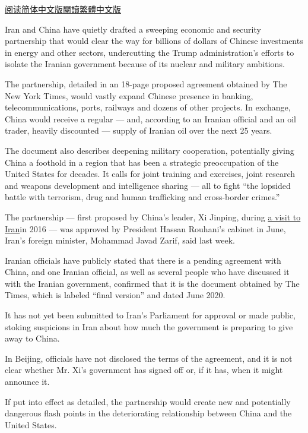 \href{https://cn.nytimes.com/world/20200713/china-iran-trade-military-deal/}{阅读简体中文版}\href{https://cn.nytimes.com/world/20200713/china-iran-trade-military-deal/zh-hant/}{閱讀繁體中文版}

Iran and China have quietly drafted a sweeping economic and security
partnership that would clear the way for billions of dollars of Chinese
investments in energy and other sectors, undercutting the Trump
administration's efforts to isolate the Iranian government because of
its nuclear and military ambitions.

The partnership, detailed in an 18-page proposed agreement obtained by
The New York Times, would vastly expand Chinese presence in banking,
telecommunications, ports, railways and dozens of other projects. In
exchange, China would receive a regular --- and, according to an Iranian
official and an oil trader, heavily discounted --- supply of Iranian oil
over the next 25 years.

The document also describes deepening military cooperation, potentially
giving China a foothold in a region that has been a strategic
preoccupation of the United States for decades. It calls for joint
training and exercises, joint research and weapons development and
intelligence sharing --- all to fight ``the lopsided battle with
terrorism, drug and human trafficking and cross-border crimes.''

The partnership --- first proposed by China's leader, Xi Jinping, during
\href{https://www.nytimes.com/2016/01/31/world/asia/xi-jinping-visits-saudi-iran.html}{a
visit to Iran}in 2016 --- was approved by President Hassan Rouhani's
cabinet in June, Iran's foreign minister, Mohammad Javad Zarif, said
last week.

Iranian officials have publicly stated that there is a pending agreement
with China, and one Iranian official, as well as several people who have
discussed it with the Iranian government, confirmed that it is the
document obtained by The Times, which is labeled ``final version'' and
dated June 2020.

It has not yet been submitted to Iran's Parliament for approval or made
public, stoking suspicions in Iran about how much the government is
preparing to give away to China.

In Beijing, officials have not disclosed the terms of the agreement, and
it is not clear whether Mr. Xi's government has signed off or, if it
has, when it might announce it.

If put into effect as detailed, the partnership would create new and
potentially dangerous flash points in the deteriorating relationship
between China and the United States.

